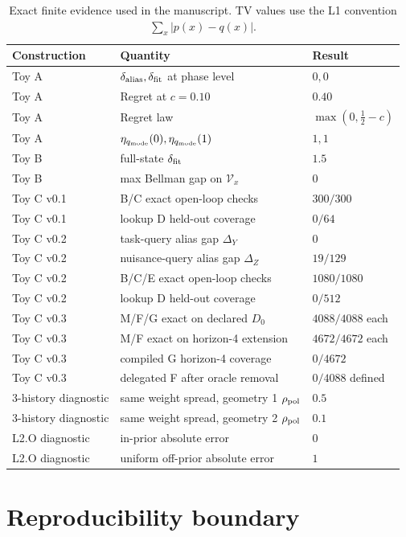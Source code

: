 \documentclass[10pt]{article}
\begin{document}
\begin{table}[H]
\centering
\caption{Exact finite evidence used in the manuscript. TV values use the L1 convention $\sum_x|p(x)-q(x)|$.}
\begin{tabular}{@{}lll@{}}
\toprule
Construction & Quantity & Result \\
\midrule
Toy A & $\delta_{\rm alias},\delta_{\rm fit}$ at phase level & $0,0$ \\
Toy A & Regret at $c=0.10$ & $0.40$ \\
Toy A & Regret law & $\max(0,\frac12-c)$ \\
Toy A & $\eta_{q_{\rm mode}}(0),\eta_{q_{\rm mode}}(1)$ & $1,1$ \\
Toy B & full-state $\delta_{\rm fit}$ & $1.5$ \\
Toy B & max Bellman gap on $\mathcal V_x$ & $0$ \\
Toy C v0.1 & B/C exact open-loop checks & $300/300$ \\
Toy C v0.1 & lookup D held-out coverage & $0/64$ \\
Toy C v0.2 & task-query alias gap $\Delta_Y$ & $0$ \\
Toy C v0.2 & nuisance-query alias gap $\Delta_Z$ & $19/129$ \\
Toy C v0.2 & B/C/E exact open-loop checks & $1080/1080$ \\
Toy C v0.2 & lookup D held-out coverage & $0/512$ \\
Toy C v0.3 & M/F/G exact on declared $D_0$ & $4088/4088$ each \\
Toy C v0.3 & M/F exact on horizon-4 extension & $4672/4672$ each \\
Toy C v0.3 & compiled G horizon-4 coverage & $0/4672$ \\
Toy C v0.3 & delegated F after oracle removal & $0/4088$ defined \\
3-history diagnostic & same weight spread, geometry 1 $\rho_{\rm pol}$ & $0.5$ \\
3-history diagnostic & same weight spread, geometry 2 $\rho_{\rm pol}$ & $0.1$ \\
L2.O diagnostic & in-prior absolute error & $0$ \\
L2.O diagnostic & uniform off-prior absolute error & $1$ \\
\bottomrule
\end{tabular}
\end{table}

\section{Reproducibility boundary}
\end{document}
